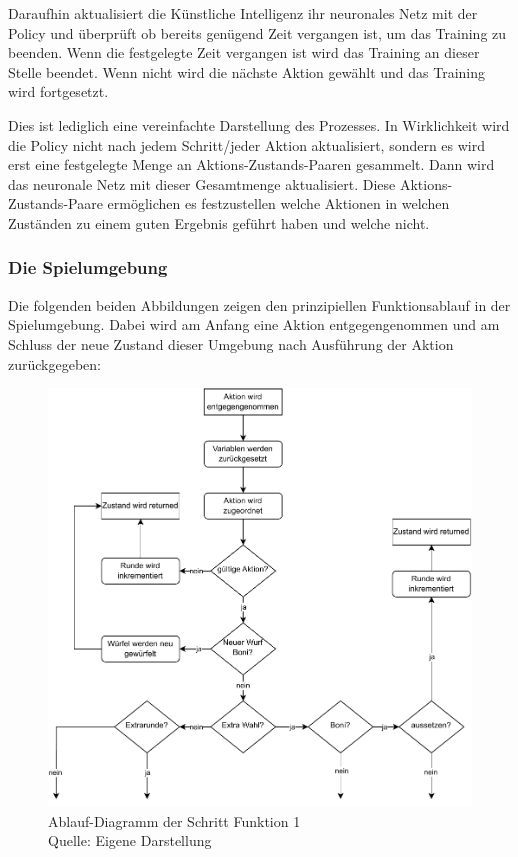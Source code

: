 Daraufhin aktualisiert die Künstliche Intelligenz ihr neuronales Netz mit der Policy und überprüft ob bereits genügend Zeit vergangen ist, um das Training zu beenden. Wenn die festgelegte Zeit vergangen ist wird das Training an dieser Stelle beendet. Wenn nicht wird die nächste Aktion gewählt und das Training wird fortgesetzt.

Dies ist lediglich eine vereinfachte Darstellung des Prozesses. In Wirklichkeit wird die Policy nicht nach jedem Schritt/jeder Aktion aktualisiert, sondern es wird erst eine festgelegte Menge an Aktions-Zustands-Paaren gesammelt. Dann wird das neuronale Netz mit dieser Gesamtmenge aktualisiert. Diese Aktions-Zustands-Paare ermöglichen es festzustellen welche Aktionen in welchen Zuständen zu einem guten Ergebnis geführt haben und welche nicht.
\subsubsection{Die Spielumgebung}
Die folgenden beiden Abbildungen zeigen den prinzipiellen Funktionsablauf in der Spielumgebung. Dabei wird am Anfang eine Aktion entgegengenommen und am Schluss der neue Zustand dieser Umgebung nach Ausführung der Aktion zurückgegeben:
\nopagebreak
\begin{figure}[H]
	\includegraphics[width=1\textwidth]{Bilder/step3.drawio} 
	\caption[Ablauf-Diagramm der Schritt Funktion 1]{Ablauf-Diagramm der Schritt Funktion 1\\ Quelle: Eigene Darstellung}
\end{figure}	

